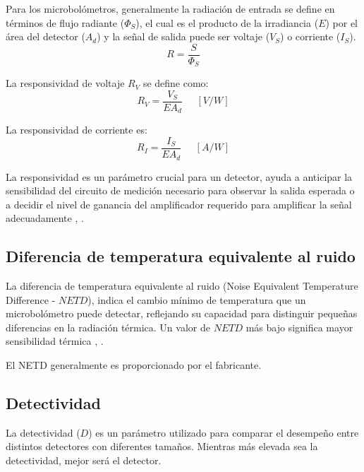         Para los microbolómetros, generalmente la radiación de entrada se define en términos de flujo radiante ($\Phi_{S}$), el cual es el producto de la irradiancia ($E$) por el área del detector ($A_{d}$) y la señal de salida  puede ser voltaje ($V_{S}$) o corriente ($I_{S}$).
        \begin{equation}
        R = \frac{S}{\Phi_{S}}
        \label{eq:Responsividad}
        \end{equation}
        
        La responsividad de voltaje $R_{V}$ se define como:
        \begin{equation}
        R_{V} = \frac{V_{S}}{EA_{d}}\phantom{abc} [V/W]
        \label{eq:Rv}
        \end{equation}
        
        La responsividad de corriente es:
        \begin{equation}
        R_{I} = \frac{I_{S}}{EA_{d}}\phantom{abc} [A/W]
        \label{eq:Ri}
        \end{equation}
        
        La responsividad es un parámetro crucial para un detector, ayuda a anticipar la sensibilidad del circuito de medición necesario para observar la salida esperada o a decidir el nivel de ganancia del amplificador requerido para amplificar la señal adecuadamente \cite{Vincent}, \cite{Budzier}.
        
        \subsection{Diferencia de temperatura equivalente al ruido}
        La diferencia de temperatura equivalente al ruido (Noise Equivalent Temperature Difference - $NETD$), indica el cambio mínimo de temperatura que un microbolómetro puede detectar, reflejando su capacidad para distinguir pequeñas diferencias en la radiación térmica. Un valor de $NETD$ más bajo significa mayor sensibilidad térmica \cite{Jimenez}, \cite{Budzier}.


El NETD generalmente es proporcionado por el fabricante.
        
        \subsection{Detectividad}
        La detectividad ($D$) es un parámetro utilizado para comparar el desempeño entre distintos detectores con diferentes tamaños. Mientras más elevada sea la detectividad, mejor será el detector.
        
